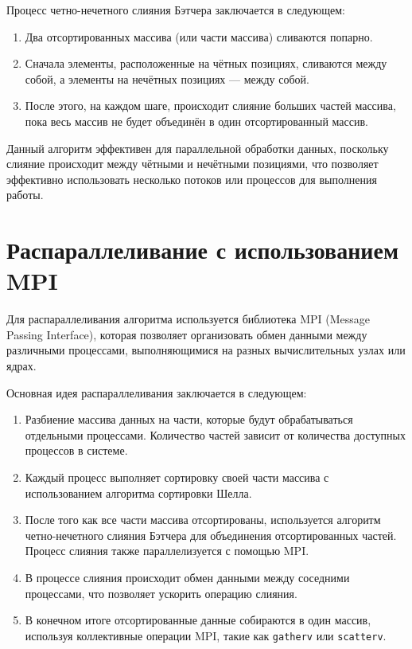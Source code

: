 \documentclass[a4paper,12pt]{article}
\begin{document}
Процесс четно-нечетного слияния Бэтчера заключается в следующем:
\begin{enumerate}
    \item Два отсортированных массива (или части массива) сливаются попарно.
    \item Сначала элементы, расположенные на чётных позициях, сливаются между собой, а элементы на нечётных позициях — между собой.
    \item После этого, на каждом шаге, происходит слияние больших частей массива, пока весь массив не будет объединён в один отсортированный массив.
\end{enumerate}

Данный алгоритм эффективен для параллельной обработки данных, поскольку слияние происходит между чётными и нечётными позициями, что позволяет эффективно использовать несколько потоков или процессов для выполнения работы.

\section{Распараллеливание с использованием MPI}
Для распараллеливания алгоритма используется библиотека MPI (Message Passing Interface), которая позволяет организовать обмен данными между различными процессами, выполняющимися на разных вычислительных узлах или ядрах.

Основная идея распараллеливания заключается в следующем:
\begin{enumerate}
    \item Разбиение массива данных на части, которые будут обрабатываться отдельными процессами. Количество частей зависит от количества доступных процессов в системе.
    \item Каждый процесс выполняет сортировку своей части массива с использованием алгоритма сортировки Шелла.
    \item После того как все части массива отсортированы, используется алгоритм четно-нечетного слияния Бэтчера для объединения отсортированных частей. Процесс слияния также параллелизуется с помощью MPI.
    \item В процессе слияния происходит обмен данными между соседними процессами, что позволяет ускорить операцию слияния.
    \item В конечном итоге отсортированные данные собираются в один массив, используя коллективные операции MPI, такие как \texttt{gatherv} или \texttt{scatterv}.
\end{enumerate}
\end{document}
